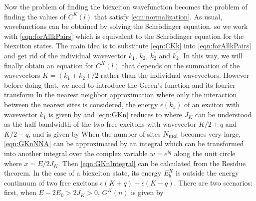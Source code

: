 Now the problem of finding the biexciton wavefunction becomes the problem of finding the values of $C^{K}(l)$ that 
satisfy \autoref{eqn:normalization}. As usual, wavefunctions can be obtained by solving the Schr{\" o}dinger equation, so
 we work with \autoref{eqn:forAllkPairs} which is equivalent to the Schr{\" o}dinger equation for the biexciton states. 
The main idea is to substitute \autoref{eqn:CKk} into \autoref{eqn:forAllkPairs} and get rid of the individual 
wavevector $k_1$, $k_2$, $k_2^{'}$ and $k_2^{'}$. In this way, we will finally obtain an equation for $C^{K}(l)$ that
 depends on the summation of the wavevectors $K = (k_1 + k_2)/2$ rather than the individual wavevectors. However 
before doing that, we need to introduce the Green's function
and its fourier transform
In the nearest neighbor approximation where only the interaction between the nearest sites is considered,  the energy $\epsilon(k_1)$ of an exciton with wavevector $k_1$ is given by
and \autoref{eqn:GKn} reduces to
where $J_{K}$ can be understood as the half bandwidth of the two free excitons with wavevector $K/2 + q$ and $K/2-q$,
 and is given by
When the number of sites $N_{\rm mol}$ becomes very large, \autoref{eqn:GKnNNA} can be approximated by an
 integral
which can be transformed into another integral over the complex variable $w=e^{iq}$ along the unit circle
where $x = E/2J_K $. Then \autoref{eqn:GKnIntegral} can be calculated from the Residue theorem. In the case of a
 biexciton state, its energy $E^{K}_{b}$ is outside the energy continuum of two free excitons 
$\epsilon(K+q) + \epsilon(K-q)$. There are  two scenarios:  first, when $E - 2 E_0 > 2 J_K >0$, $G^{K}(n)$ is given by
